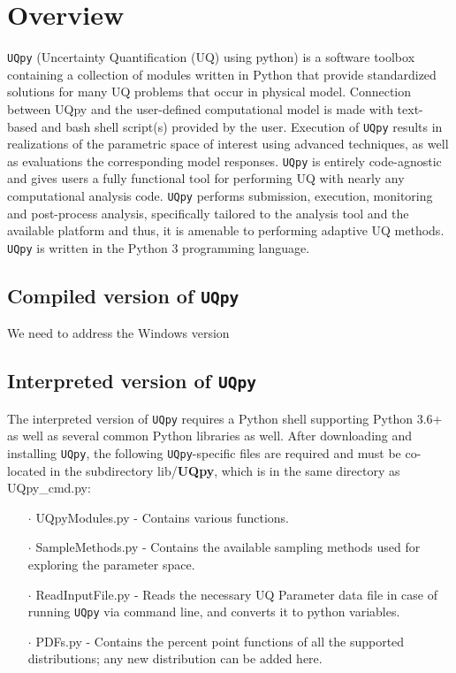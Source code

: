 \section{Overview}
\label{S:overview}
\noindent
\texttt{UQpy} (Uncertainty Quantification (UQ) using python) is a software toolbox containing a collection of modules  written in Python that provide standardized solutions for many UQ problems that occur in physical model. Connection between UQpy and the user-defined computational model is made with text-based and bash shell script(s) provided by the user. Execution of \texttt{UQpy} results in realizations of the parametric space of interest using advanced techniques, as well as evaluations the corresponding model responses. \texttt{UQpy} is entirely code-agnostic and gives users a fully functional tool for performing UQ with nearly any computational analysis code. \texttt{UQpy} performs submission, execution, monitoring and post-process analysis, specifically tailored to  the analysis tool and the available platform and thus, it is amenable to performing adaptive UQ methods. \texttt{UQpy} is written in the Python 3 programming language.

\subsection{Compiled version of \texttt{UQpy}}

\noindent
{\color{red} We need to address the Windows version}

\subsection{Interpreted version of \texttt{UQpy}}

\noindent
The interpreted version of \texttt{UQpy} requires a Python shell supporting Python 3.6+ as well as several common Python libraries as well.  After downloading and installing \texttt{UQpy}, the following \texttt{UQpy}-specific files are required and must be co-located in the subdirectory lib/\textbf{UQpy}, which is in the same directory as {\color{blue}UQpy\_cmd.py}:

\begin{itemize}
\item[$\cdot$] {\color{blue}UQpyModules.py} - Contains various functions.
\item[$\cdot$] {\color{blue}SampleMethods.py} - Contains the available sampling methods used for exploring the parameter space.
\item[$\cdot$] {\color{blue}ReadInputFile.py} -  Reads the necessary UQ Parameter data file  in case of running \texttt{UQpy}  via command line, and converts it to  python variables. 
\item[$\cdot$] {\color{blue}PDFs.py} - Contains the percent point functions of all the supported distributions; any new distribution can be added here. 
\end{itemize}

